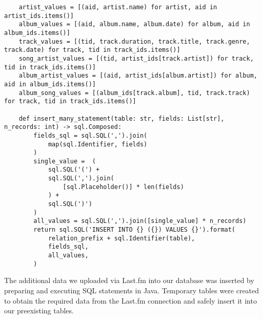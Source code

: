 \documentclass[12pt]{article}
\begin{document}
    \begin{lstlisting}
    artist_values = [(aid, artist.name) for artist, aid in artist_ids.items()]
    album_values = [(aid, album.name, album.date) for album, aid in album_ids.items()]
    track_values = [(tid, track.duration, track.title, track.genre, track.date) for track, tid in track_ids.items()]
    song_artist_values = [(tid, artist_ids[track.artist]) for track, tid in track_ids.items()]
    album_artist_values = [(aid, artist_ids[album.artist]) for album, aid in album_ids.items()]
    album_song_values = [(album_ids[track.album], tid, track.track) for track, tid in track_ids.items()]

    def insert_many_statement(table: str, fields: List[str], n_records: int) -> sql.Composed:
        fields_sql = sql.SQL(',').join(
            map(sql.Identifier, fields)
        )
        single_value =  (
            sql.SQL('(') +
            sql.SQL(',').join(
                [sql.Placeholder()] * len(fields)
            ) +
            sql.SQL(')')
        )
        all_values = sql.SQL(',').join([single_value] * n_records)
        return sql.SQL('INSERT INTO {} ({}) VALUES {}').format(
            relation_prefix + sql.Identifier(table),
            fields_sql,
            all_values,
        )
    \end{lstlisting}


    \noindent The additional data we uploaded via Last.fm into our database was inserted
    by preparing and executing SQL statements in Java. Temporary tables
    were created to obtain the required data from the Last.fm connection and safely
    insert it into our preexisting tables.
\end{document}
